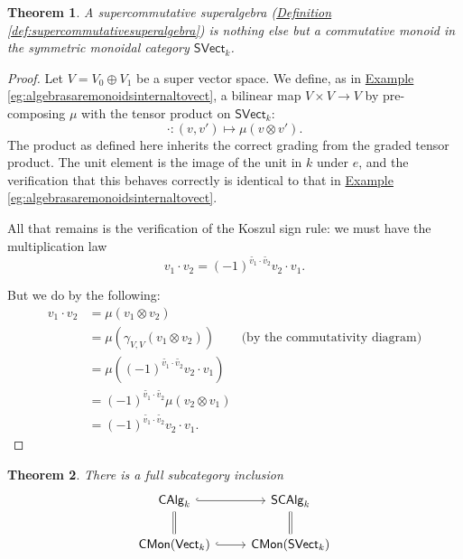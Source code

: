 \documentclass[a4paper]{report}
\theoremstyle{definition}
\theoremstyle{plain}
\newtheorem{theorem}{Theorem}[section]
\theoremstyle{remark}
\begin{document}
\begin{theorem}
  A supercommutative superalgebra (\hyperref[def:supercommutativesuperalgebra]{Definition \ref*{def:supercommutativesuperalgebra}}) is nothing else but a commutative monoid in the symmetric monoidal category $\mathsf{SVect}_{k}$.
\end{theorem}
\begin{proof}
  Let $V = V_{0} \oplus V_{1}$ be a super vector space. We define, as in \hyperref[eg:algebrasaremonoidsinternaltovect]{Example \ref*{eg:algebrasaremonoidsinternaltovect}}, a bilinear map $V \times V \to V$ by pre-composing $\mu$ with the tensor product on $\mathsf{SVect}_{k}$:
  \begin{equation*}
    \cdot\colon (v, v') \mapsto \mu(v \otimes v').
  \end{equation*}
  The product as defined here inherits the correct grading from the graded tensor product. The unit element is the image of the unit in $k$ under $e$, and the verification that this behaves correctly is identical to that in \hyperref[eg:algebrasaremonoidsinternaltovect]{Example \ref*{eg:algebrasaremonoidsinternaltovect}}.

  All that remains is the verification of the Koszul sign rule: we must have the multiplication law
  \begin{equation*}
    v_{1} \cdot v_{2} = (-1)^{\tilde{v_{1}} \cdot \tilde{v_{2}}} v_{2} \cdot v_{1}.
  \end{equation*}

  But we do by the following:
  \begin{align*}
    v_{1} \cdot v_{2} &= \mu(v_{1} \otimes v_{2}) \\
    &= \mu(\gamma_{V, V}(v_{1} \otimes v_{2})) &\text{(by the commutativity diagram)}\\ 
    &= \mu((-1)^{\tilde{v_{1}} \cdot \tilde{v_{2}}} v_{2} \cdot v_{1}) \\
    &= (-1)^{\tilde{v_{1}} \cdot \tilde{v_{2}}} \mu(v_{2} \otimes v_{1}) \\
    &= (-1)^{\tilde{v_{1}} \cdot \tilde{v_{2}}} v_{2} \cdot v_{1}.
  \end{align*}
\end{proof} 

\begin{theorem}
  There is a full subcategory inclusion
  \begin{equation*}
    \begin{tikzcd}
      \mathsf{CAlg}_{k}
      \arrow[d, equals]
      \arrow[r, hookrightarrow]
      & \mathsf{SCAlg}_{k}
      \arrow[d, equals]
      \\
      \mathsf{CMon}(\mathsf{Vect}_{k}) 
      \arrow[r, hookrightarrow]
      & \mathsf{CMon}(\mathsf{SVect}_{k})
    \end{tikzcd}
  \end{equation*}
\end{theorem}
\end{document}
